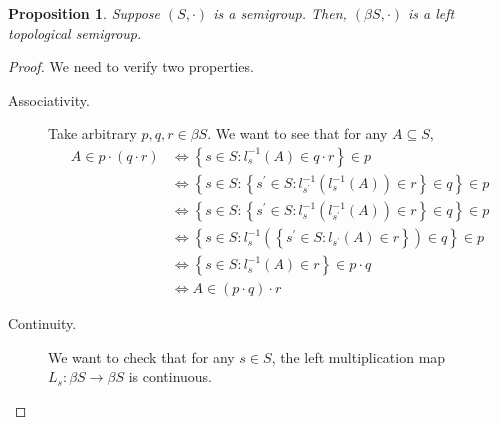\documentclass[11pt,letterpaper]{article}
\newtheorem{prop}{Proposition}
\newcommand{\inv}{^{-1}}
\newcommand{\parens}[1]{\left(#1\right)}
\newcommand{\setof}[1]{\left\{#1\right\}}
\begin{document}
\begin{prop}
    Suppose $(S, \cdot)$ is a semigroup. Then, $(\beta S, \cdot)$ is a left
    topological semigroup.
\end{prop}

\begin{proof}
    We need to verify two properties.

    \begin{description}
        \item[Associativity.]
            Take arbitrary $p, q, r \in \beta S$.
            We want to see that for any $A \subseteq S$,
            \begin{align*}
                A \in p \cdot (q \cdot r)
                & \iff
                \setof{
                    s \in S :
                    l_s\inv (A) \in q \cdot r
                }
                \in p \\
                & \iff
                \setof{
                    s \in S :
                    \setof{
                        s^\prime \in S :
                        l_{s^\prime}\inv ( l_s\inv (A) )
                        \in r
                    }
                    \in q
                }
                \in p \\
                & \iff
                \setof{
                    s \in S :
                    \setof{
                        s^\prime \in S :
                        l_s\inv ( l_{s^\prime}\inv (A) )
                        \in r
                    }
                    \in q
                }
                \in p \\
                & \iff
                \setof{
                    s \in S :
                    l_s\inv \parens{
                        \setof{
                            s^\prime \in S :
                            l_{s^\prime} (A)
                            \in r
                        }
                    }
                    \in q
                }
                \in p \\
                & \iff
                \setof{
                    s \in S :
                    l_s\inv (A) \in r
                }
                \in p \cdot q \\
                & \iff
                A \in (p \cdot q) \cdot r
            \end{align*}

        \item[Continuity.]
            We want to check that for any $s \in S$, the left multiplication
            map $L_s : \beta S \to \beta S$ is continuous.


\end{description}
\end{proof}
\end{document}

